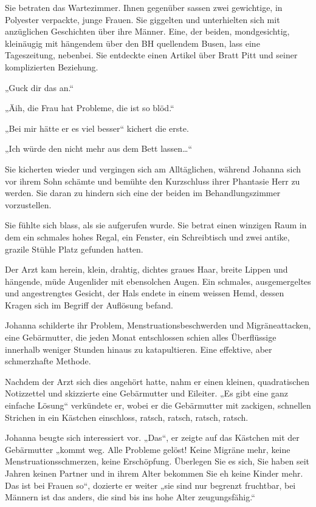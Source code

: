 \documentclass[10pt,titlepage,a5paper]{book}
\begin{document}
Sie betraten das Wartezimmer. Ihnen gegenüber sassen zwei gewichtige, in Polyester verpackte, junge Frauen. Sie giggelten und unterhielten sich mit anzüglichen Geschichten über ihre Männer. Eine, der beiden, mondgesichtig, kleinäugig mit hängendem über den BH quellendem Busen, lass eine Tageszeitung, nebenbei. Sie entdeckte einen Artikel über Bratt Pitt und seiner komplizierten Beziehung. 

„Guck dir das an.“

„Äih, die  Frau hat Probleme, die ist so blöd.“

„Bei mir hätte er es viel besser“ kichert die erste.

„Ich würde den nicht mehr aus dem Bett lassen\dots “

Sie kicherten wieder und vergingen sich am Alltäglichen, während Johanna sich vor ihrem Sohn schämte und bemühte den Kurz\-sch\-luss ihrer Phantasie Herr zu werden. Sie daran zu hindern sich eine der beiden im Behandlungszimmer vorzustellen.

Sie fühlte sich blass, als sie aufgerufen wurde. 
Sie betrat einen winzigen Raum in dem ein schmales hohes Regal, ein Fenster, ein Sch\-reibtisch und zwei antike, grazile Stühle Platz gefunden hatten.

Der Arzt kam herein, klein, drahtig, dichtes graues Haar, breite Lippen und hängende, müde Augenlider mit ebensolchen Augen. Ein schmales, ausgemergeltes und angestrengtes Gesicht, der Hals endete in einem weissen Hemd, dessen Kragen sich im Begriff der Auflösung befand.

Johanna schilderte ihr Problem, Menstruationsbeschwerden und Migräneattacken, eine Gebärmutter, die jeden Monat entschlossen schien alles Überflüssige innerhalb weniger Stunden hinaus zu katapultieren. Eine effektive, aber schmerzhafte Methode.

Nachdem der Arzt sich dies angehört hatte, nahm er einen kleinen, quadratischen Notizzettel und skizzierte eine Gebärmutter und Eileiter. „Es gibt eine ganz einfache Lösung“ verkündete er, wobei er die Gebärmutter mit zackigen, schnellen Strichen in ein Käst\-chen einschloss, ratsch, ratsch, ratsch, ratsch.

Johanna beugte sich interessiert vor. „Das“, er zeigte auf das Käst\-chen mit der Gebärmutter „kommt weg. Alle Probleme gelöst! Keine Migräne mehr, keine Menstruationsschmerzen, keine Erschöpf\-ung. Überlegen Sie es sich, Sie haben seit Jahren keinen Partner und in ihrem Alter bekommen Sie eh keine Kinder mehr. Das ist bei Frauen so“, dozierte er weiter „sie sind nur begrenzt fruchtbar, bei Männern ist das anders, die sind bis ins hohe Alter zeugungsfähig.“
\end{document}
